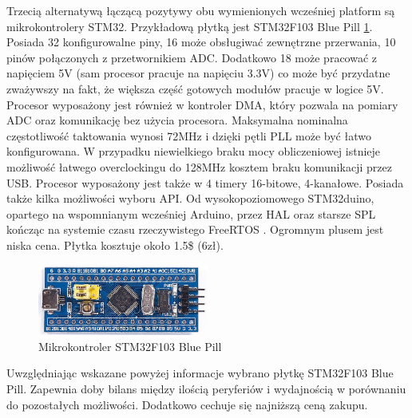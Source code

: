 		Trzecią alternatywą łączącą pozytywy obu wymienionych wcześniej platform są mikrokontrolery STM32. Przykładową płytką jest STM32F103 Blue Pill \ref{fig:bluepillPlytka}. Posiada 32 konfigurowalne piny, 16 może obsługiwać zewnętrzne przerwania, 10 pinów połączonych z przetwornikiem ADC. Dodatkowo 18 może pracować z napięciem 5V (sam procesor pracuje na napięciu 3.3V) co może być przydatne zważywszy na fakt, że większa część gotowych modułów pracuje w logice 5V. Procesor wyposażony jest również w kontroler DMA, który pozwala na pomiary ADC oraz komunikację bez użycia procesora. Maksymalna nominalna częstotliwość taktowania wynosi 72MHz i dzięki pętli PLL może być łatwo konfigurowana. W przypadku niewielkiego braku mocy obliczeniowej istnieje możliwość łatwego overclockingu do 128MHz kosztem braku komunikacji przez USB. Procesor wyposażony jest także w 4 timery 16-bitowe, 4-kanałowe. Posiada także kilka możliwości wyboru API. Od wysokopoziomowego STM32duino, opartego na wspomnianym wcześniej Arduino, przez HAL oraz starsze SPL kończąc na systemie czasu rzeczywistego FreeRTOS \cite{FreeRTOS}. Ogromnym plusem jest niska cena. Płytka kosztuje około 1.5\$ (6zł).
	
		\begin{figure}[ht]
			\centering
			\includegraphics[width=0.5\textwidth]{rysKonstrukcja/bluepill.jpg} 
			\caption{Mikrokontroler STM32F103 Blue Pill}
			\label{fig:bluepillPlytka}
		\end{figure}
		
		Uwzględniając wskazane powyżej informacje wybrano płytkę STM32F103 Blue Pill. Zapewnia doby bilans między ilością peryferiów i wydajnością w porównaniu do pozostałych możliwości. Dodatkowo cechuje się najniższą ceną zakupu.

